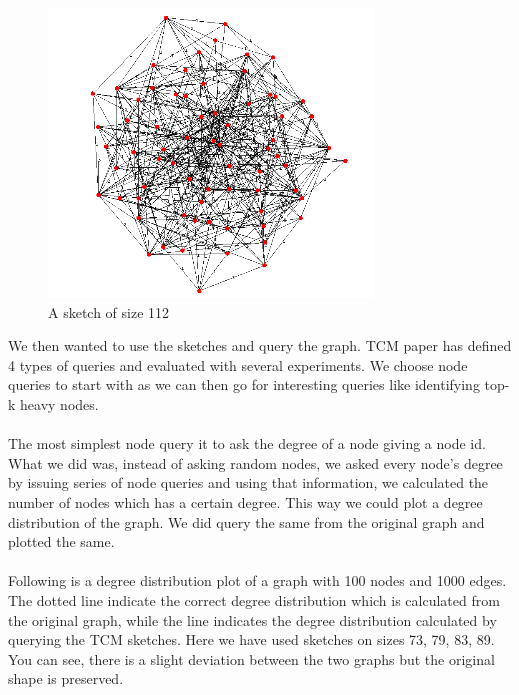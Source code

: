 \documentclass[12pt]{report}
\numberwithin{figure}{section}
\numberwithin{table}{section}
\begin{document}
\begin{figure}[H]
\centering
\includegraphics[scale=0.8]{images/s3}
\caption{A sketch of size 112}
\end{figure}

We then wanted to use the sketches and query the graph. TCM paper has defined 4 types of queries and evaluated with several experiments. We choose node queries to start with as we can  then go for interesting queries like identifying top-k heavy nodes. 

\paragraph{}

The most simplest node query it to ask the degree of a node giving a node id. What we did was, instead of asking random nodes, we asked every node’s degree by issuing series of node queries and using that information, we calculated the number of nodes which has a certain degree. This way we could plot a degree distribution of the graph. We did query the same from the original graph and plotted the same.

\paragraph{}

Following is a degree distribution plot of a graph with 100 nodes and 1000 edges. The dotted line indicate the correct degree distribution which is calculated from the original graph, while the line indicates the degree distribution calculated by querying the TCM sketches. Here we have used sketches on sizes 73, 79, 83, 89. You can see, there is a slight deviation between the two graphs but the original shape is preserved. 
\end{document}
